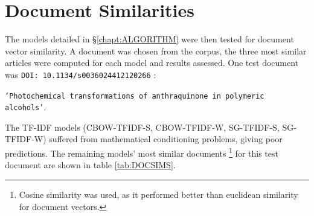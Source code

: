 \section{Document Similarities}
The models detailed in \S\ref{chapt:ALGORITHM} were then tested for document vector similarity. A document was chosen from the corpus, the three most similar articles were computed for each model and results assessed. One test document was \texttt{DOI: 10.1134/s0036024412120266} \cite{docassay}:


\texttt{`Photochemical transformations of anthraquinone in polymeric alcohols'}.

 The TF-IDF models (CBOW-TFIDF-S, CBOW-TFIDF-W, SG-TFIDF-S, SG-TFIDF-W) suffered from mathematical conditioning problems, giving poor predictions. The remaining models' most similar documents \footnote{Cosine similarity was used, as it performed better than euclidean similarity for document vectors.} for this test document are shown in table \ref{tab:DOCSIMS}.
